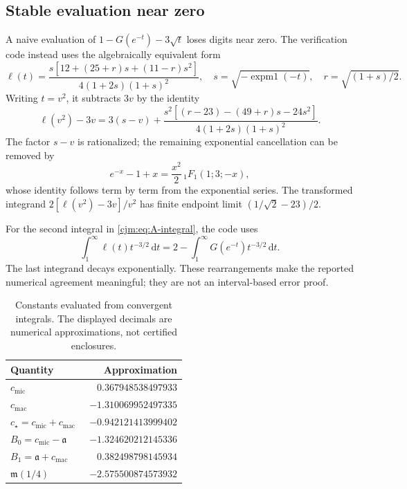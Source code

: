 \documentclass[11pt,a4paper]{article}
\theoremstyle{definition}\newaliascnt{definition}{theorem}
\theoremstyle{remark}\newaliascnt{remark}{theorem}
\newcommand{\dd}{\mathrm d}
\newcommand{\cjmic}{c_{\mathrm{mic}}}
\newcommand{\cjmac}{c_{\mathrm{mac}}}
\begin{document}
\subsection{Stable evaluation near zero}
A naive evaluation of $1-G(e^{-t})-3\sqrt t$ loses digits near zero.
The verification code instead uses the algebraically equivalent form
\begin{equation}
 \ell(t)=\frac{s[12+(25+r)s+(11-r)s^2]}{4(1+2s)(1+s)^2},
 \quad s=\sqrt{-\operatorname{expm1}(-t)},\quad
 r=\sqrt{(1+s)/2}.
 \label{cjm:eq:ell-stable}
\end{equation}
Writing $t=v^2$, it subtracts $3v$ by the identity
\begin{equation}
 \ell(v^2)-3v=3(s-v)+
 \frac{s^2[(r-23)-(49+r)s-24s^2]}{4(1+2s)(1+s)^2}.
 \label{cjm:eq:ell-remainder}
\end{equation}
The factor $s-v$ is rationalized; the remaining exponential cancellation
can be removed by
\[
 e^{-x}-1+x=\frac{x^2}{2}\,{}_1F_1(1;3;-x),
\]
whose identity follows term by term from the exponential series. The
transformed integrand $2[\ell(v^2)-3v]/v^2$ has finite endpoint limit
$(1/\sqrt2-23)/2$.

For the second integral in \eqref{cjm:eq:A-integral}, the code uses
\[
 \int_1^\infty\ell(t)t^{-3/2}\,\dd t
      =2-\int_1^\infty G(e^{-t})t^{-3/2}\,\dd t.
\]
The last integrand decays exponentially. These rearrangements make the
reported numerical agreement meaningful; they are not an interval-based
error proof.

\begin{table}[htbp]
\centering
\caption{Constants evaluated from convergent integrals. The displayed
decimals are numerical approximations, not certified enclosures.}
\begin{tabular}{lr}
\toprule
Quantity & Approximation\\
\midrule
$\cjmic$ & $\phantom{-}0.367948538497933$\\
$\cjmac$ & $-1.310069952497335$\\
$c_\star=\cjmic+\cjmac$ & $-0.942121413999402$\\
$B_0=\cjmic-\mathfrak a$ & $-1.324620212145336$\\
$B_1=\mathfrak a+\cjmac$ & $\phantom{-}0.382498798145934$\\
$\mathfrak m(1/4)$ & $-2.575500874573932$\\
\bottomrule
\end{tabular}
\label{cjm:tab:constants}
\end{table}
\end{document}
